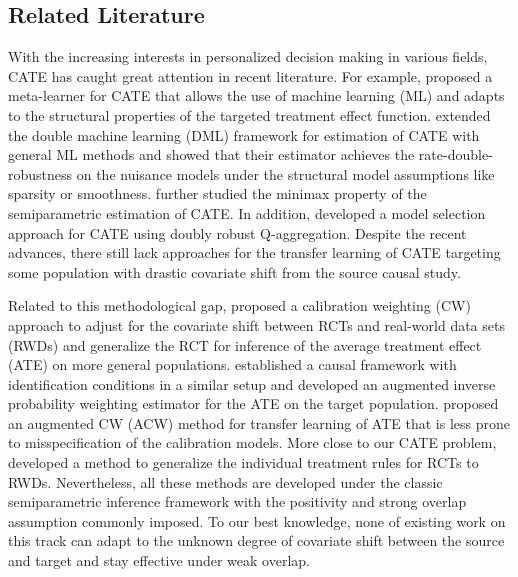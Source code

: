 \documentclass[12pt,a4paper,pdftex,onepage]{article}
\begin{document}
\subsection{Related Literature}

With the increasing interests in personalized decision making in various fields, CATE has caught great attention in recent literature. For example, \cite{kunzel2019metalearners} proposed a meta-learner for CATE that allows the use of machine learning (ML) and adapts to the structural properties of the targeted treatment effect function. \cite{kennedy2020towards} extended the double machine learning (DML) framework \citep{chernozhukov2018double} for estimation of CATE with general ML methods and showed that their estimator achieves the rate-double-robustness on the nuisance models under the structural model assumptions like sparsity or smoothness. \cite{kennedy2022minimax} further studied the minimax property of the semiparametric estimation of CATE. In addition, \cite{lan2024causal} developed a model selection approach for CATE using doubly robust Q-aggregation. Despite the recent advances, there still lack approaches for the transfer learning of CATE targeting some population with drastic covariate shift from the source causal study. 


Related to this methodological gap, \cite{hartman2015sample} proposed a calibration weighting (CW) approach to adjust for the covariate shift between RCTs and real-world data sets (RWDs) and generalize the RCT for inference of the average treatment effect (ATE) on more general populations. \cite{dahabreh2019generalizing} established a causal framework with identification conditions in a similar setup and developed an augmented inverse probability weighting estimator for the ATE on the target population. \cite{lee2023improving} proposed an augmented CW (ACW) method for transfer learning of ATE that is less prone to misspecification of the calibration models. More close to our CATE problem, \cite{wu2023transfer} developed a method to generalize the individual treatment rules for RCTs to RWDs. Nevertheless, all these methods are developed under the classic semiparametric inference framework with the positivity and strong overlap assumption \citep{rosenbaum1983central} commonly imposed. To our best knowledge, none of existing work on this track can adapt to the unknown degree of covariate shift between the source and target and stay effective under weak overlap.
\end{document}
